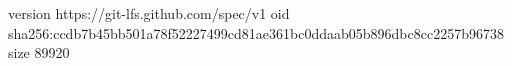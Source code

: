 version https://git-lfs.github.com/spec/v1
oid sha256:ccdb7b45bb501a78f52227499cd81ae361bc0ddaab05b896dbc8cc2257b96738
size 89920
